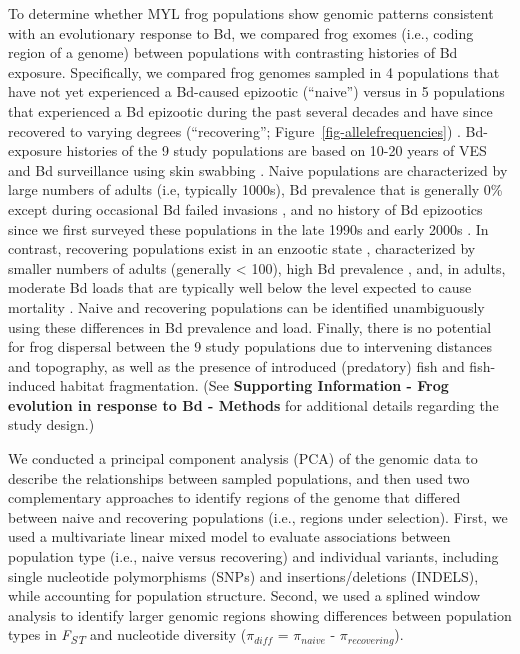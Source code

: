 \documentclass[9pt,twocolumn,twoside,lineno]{pnas-new}
\begin{document}
To determine whether MYL frog populations show genomic patterns
consistent with an evolutionary response to Bd, we compared frog exomes
(i.e., coding region of a genome) between populations with contrasting
histories of Bd exposure. Specifically, we compared frog genomes sampled
in 4 populations that have not yet experienced a Bd-caused epizootic
(``naive'') \citep{zhou2015} versus in 5 populations that experienced a
Bd epizootic during the past several decades and have since recovered to
varying degrees (``recovering''; Figure~\ref{fig-allelefrequencies})
\citep{knapp2016, vredenburg2010}. Bd-exposure histories of the 9 study
populations are based on 10-20 years of VES and Bd surveillance using
skin swabbing \citep[e.g.,][]{knapp2016, zhou2015, wilber2022}. Naive
populations are characterized by large numbers of adults (i.e, typically
1000s), Bd prevalence that is generally 0\% except during occasional Bd
failed invasions \citep[during which Bd loads remain very
low,][]{wilber2022}, and no history of Bd epizootics since we first
surveyed these populations in the late 1990s and early 2000s
\citep{zhou2015}. In contrast, recovering populations exist in an
enzootic state \citep{briggs2010}, characterized by smaller numbers of
adults (generally \textless{} 100), high Bd prevalence \citep[often
\textgreater{} 80\%,][]{knapp2011}, and, in adults, moderate Bd loads
that are typically well below the level expected to cause mortality
\citep{vredenburg2010}. Naive and recovering populations can be
identified unambiguously using these differences in Bd prevalence and
load. Finally, there is no potential for frog dispersal between the 9
study populations due to intervening distances and topography, as well
as the presence of introduced (predatory) fish and fish-induced habitat
fragmentation. (See \textbf{Supporting Information - Frog evolution in
response to Bd - Methods} for additional details regarding the study
design.)

We conducted a principal component analysis (PCA) of the genomic data to
describe the relationships between sampled populations, and then used
two complementary approaches to identify regions of the genome that
differed between naive and recovering populations (i.e., regions under
selection). First, we used a multivariate linear mixed model to evaluate
associations between population type (i.e., naive versus recovering) and
individual variants, including single nucleotide polymorphisms (SNPs)
and insertions/deletions (INDELS), while accounting for population
structure. Second, we used a splined window analysis to identify larger
genomic regions showing differences between population types in
\emph{F\textsubscript{ST}} and nucleotide diversity (\(\pi_{diff}\) =
\(\pi_{naive}\) - \(\pi_{recovering}\)).
\end{document}
